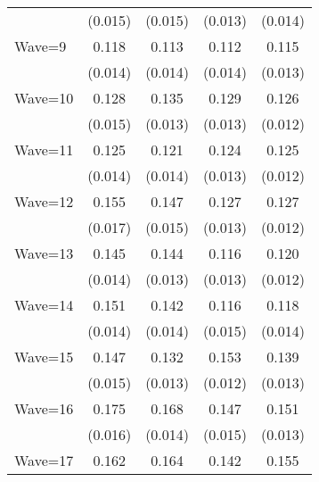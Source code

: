 {\begin{tabular}{l*{4}{c}}
                    &     (0.015)         &     (0.015)         &     (0.013)         &     (0.014)         \\
Wave=9              &       0.118\sym{***}&       0.113\sym{***}&       0.112\sym{***}&       0.115\sym{***}\\
                    &     (0.014)         &     (0.014)         &     (0.014)         &     (0.013)         \\
Wave=10             &       0.128\sym{***}&       0.135\sym{***}&       0.129\sym{***}&       0.126\sym{***}\\
                    &     (0.015)         &     (0.013)         &     (0.013)         &     (0.012)         \\
Wave=11             &       0.125\sym{***}&       0.121\sym{***}&       0.124\sym{***}&       0.125\sym{***}\\
                    &     (0.014)         &     (0.014)         &     (0.013)         &     (0.012)         \\
Wave=12             &       0.155\sym{***}&       0.147\sym{***}&       0.127\sym{***}&       0.127\sym{***}\\
                    &     (0.017)         &     (0.015)         &     (0.013)         &     (0.012)         \\
Wave=13             &       0.145\sym{***}&       0.144\sym{***}&       0.116\sym{***}&       0.120\sym{***}\\
                    &     (0.014)         &     (0.013)         &     (0.013)         &     (0.012)         \\
Wave=14             &       0.151\sym{***}&       0.142\sym{***}&       0.116\sym{***}&       0.118\sym{***}\\
                    &     (0.014)         &     (0.014)         &     (0.015)         &     (0.014)         \\
Wave=15             &       0.147\sym{***}&       0.132\sym{***}&       0.153\sym{***}&       0.139\sym{***}\\
                    &     (0.015)         &     (0.013)         &     (0.012)         &     (0.013)         \\
Wave=16             &       0.175\sym{***}&       0.168\sym{***}&       0.147\sym{***}&       0.151\sym{***}\\
                    &     (0.016)         &     (0.014)         &     (0.015)         &     (0.013)         \\
Wave=17             &       0.162\sym{***}&       0.164\sym{***}&       0.142\sym{***}&       0.155\sym{***}\\

\end{tabular}}
